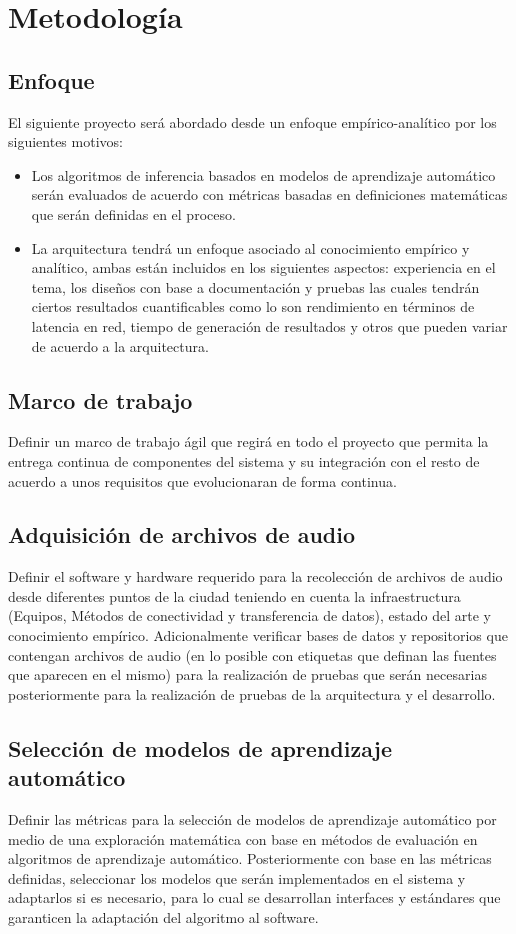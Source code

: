 \chapter{Metodología}
\section{Enfoque}
El siguiente proyecto será abordado desde un enfoque empírico-analítico por los siguientes motivos:
\begin{itemize}
    \item Los algoritmos de inferencia basados en modelos de aprendizaje automático serán evaluados de acuerdo con métricas basadas en definiciones matemáticas que serán definidas en el proceso.
    \item La arquitectura tendrá un enfoque asociado al conocimiento empírico y analítico, ambas están incluidos en los siguientes aspectos: experiencia en el tema, los diseños con base a documentación y pruebas las cuales tendrán ciertos resultados cuantificables como lo son rendimiento en términos de latencia en red, tiempo de generación de resultados y otros que pueden variar de acuerdo a la arquitectura.
\end{itemize}
\section{Marco de trabajo}
Definir un marco de trabajo ágil que regirá en todo el proyecto que permita la entrega continua de componentes del sistema y su integración con el resto de acuerdo a unos requisitos que evolucionaran de forma continua. 
\section{Adquisición de archivos de audio}
Definir el software y hardware requerido para la recolección de archivos de audio desde diferentes puntos de la ciudad teniendo en cuenta la infraestructura (Equipos, Métodos de conectividad y transferencia de datos), estado del arte y conocimiento empírico. Adicionalmente verificar bases de datos y repositorios que contengan archivos de audio (en lo posible con etiquetas que definan las fuentes que aparecen en el mismo) para la realización de pruebas que serán necesarias posteriormente para la realización de pruebas de la arquitectura y el desarrollo.
\section{Selección de modelos de aprendizaje automático}
Definir las métricas para la selección de modelos de aprendizaje automático por medio de una exploración matemática con base en métodos de evaluación en algoritmos de aprendizaje automático. Posteriormente con base en las métricas definidas, seleccionar los modelos que serán implementados en el sistema y adaptarlos si es necesario, para lo cual se desarrollan interfaces y estándares que garanticen la adaptación del algoritmo al software.
